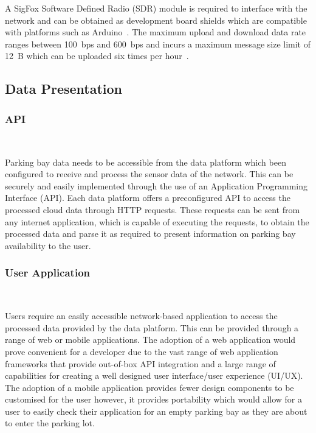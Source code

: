 \documentclass[10pt,twocolumn]{witseiepaper}
\begin{document}
\begin{itemize}
				A SigFox Software Defined Radio (SDR) module is required to interface with the network and can be obtained as development board shields which are compatible with platforms such as Arduino~\cite{sigfox-tech}. The maximum upload and download data rate ranges between 100~bps and 600~bps and incurs a maximum message size limit of 12~B which can be uploaded six times per hour~\cite{sigfox-tech}.\\

			\end{itemize}
	
	\subsection{Data Presentation}
		\subsubsection{API} $   $
		
			Parking bay data needs to be accessible from the data platform which been configured to receive and process the sensor data of the network. This can be securely and easily implemented through the use of an Application Programming Interface (API). Each data platform offers a preconfigured API to access the processed cloud data through HTTP requests. These requests can be sent from any internet application, which is capable of executing the requests, to obtain the processed data and parse it as required to present information on parking bay availability to the user.
		
		\subsubsection{User Application} $   $
		
			Users require an easily accessible network-based application to access the processed data provided by the data platform. This can be provided through a range of web or mobile applications. The adoption of a web application would prove convenient for a developer due to the vast range of web application frameworks that provide out-of-box API integration and a large range of capabilities for creating a well designed user interface/user experience (UI/UX). The adoption of a mobile application provides fewer design components to be customised for the user however, it provides portability which would allow for a user to easily check their application for an empty parking bay as they are about to enter the parking lot.
			
\end{document}
